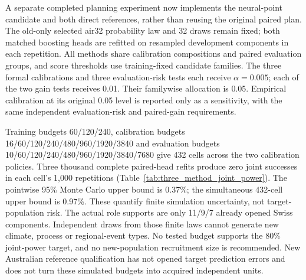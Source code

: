 A separate completed planning experiment now implements the neural-point candidate and both direct references, rather than reusing the original paired plan. The old-only selected air32 probability law and 32 draws remain fixed; both matched boosting heads are refitted on resampled development components in each repetition. All methods share calibration compositions and paired evaluation groups, and score thresholds use training-fixed candidate families. The three formal calibrations and three evaluation-risk tests each receive $\alpha=0.005$; each of the two gain tests receives 0.01. Their familywise allocation is 0.05. Empirical calibration at its original 0.05 level is reported only as a sensitivity, with the same independent evaluation-risk and paired-gain requirements.

Training budgets 60/120/240, calibration budgets 16/60/120/240/480/960/1920/3840 and evaluation budgets 10/60/120/240/480/960/1920/3840/7680 give 432 cells across the two calibration policies. Three thousand complete paired-head refits produce zero joint successes in each cell's 1,000 repetitions (Table~\ref{tab:three_method_joint_power}). The pointwise 95\% Monte Carlo upper bound is 0.37\%; the simultaneous 432-cell upper bound is 0.97\%. These quantify finite simulation uncertainty, not target-population risk. The actual role supports are only 11/9/7 already opened Swiss components. Independent draws from those finite laws cannot generate new climate, process or regional-event types. No tested budget supports the 80\% joint-power target, and no new-population recruitment size is recommended. New Australian reference qualification has not opened target prediction errors and does not turn these simulated budgets into acquired independent units.
